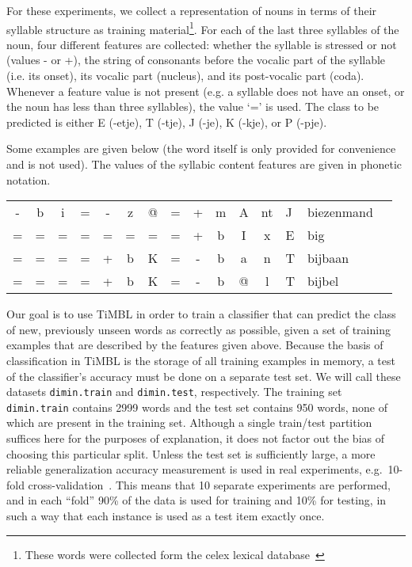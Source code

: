 \documentclass{report}
\begin{document}
For these experiments, we collect a representation of nouns in terms
of their syllable structure as training material\footnote{These words
were collected form the {\sc celex} lexical
database~\cite{Baayen+93}}. For each of the last three syllables of
the noun, four different features are collected: whether the syllable
is stressed or not (values - or +), the string of consonants before
the vocalic part of the syllable (i.e. its onset), its vocalic part
(nucleus), and its post-vocalic part (coda). Whenever a feature value
is not present (e.g. a syllable does not have an onset, or the noun
has less than three syllables), the value `=' is used. The class to be
predicted is either E (-etje), T (-tje), J (-je), K (-kje), or P
(-pje).

Some examples are given below (the word itself is only provided for
convenience and is not used). The values of the syllabic content
features are given in phonetic notation.

\begin{table}[h]
\begin{tabular}{|cccccccccccc|l|l|l|}
\hline
- & b & i & = & - & z & @ & = & + & m & A & nt & J & biezenmand \\
= & = & = & = & = & = & = & = & + & b & I & x & E & big\\
= & = & = & = & + & b & K & = & - & b & a & n & T & bijbaan\\
= & = & = & = & + & b & K & = & - & b & @ & l & T & bijbel\\
\hline
\end{tabular}
\end{table}

Our goal is to use TiMBL in order to train a classifier that can
predict the class of new, previously unseen words as correctly as
possible, given a set of training examples that are described by the
features given above. Because the basis of classification in TiMBL is
the storage of all training examples in memory, a test of the
classifier's accuracy must be done on a separate test set. We will
call these datasets {\tt dimin.train} and {\tt dimin.test},
respectively. The training set {\tt dimin.train} contains 2999 words
and the test set contains 950 words, none of which are present in the
training set. Although a single train/test partition suffices here for
the purposes of explanation, it does not factor out the bias of
choosing this particular split. Unless the test set is sufficiently
large, a more reliable generalization accuracy measurement is used in
real experiments, e.g.~10-fold cross-validation~\cite{Weiss+91}. This
means that 10 separate experiments are performed, and in each ``fold''
90\% of the data is used for training and 10\% for testing, in such a
way that each instance is used as a test item exactly once.
\end{document}
